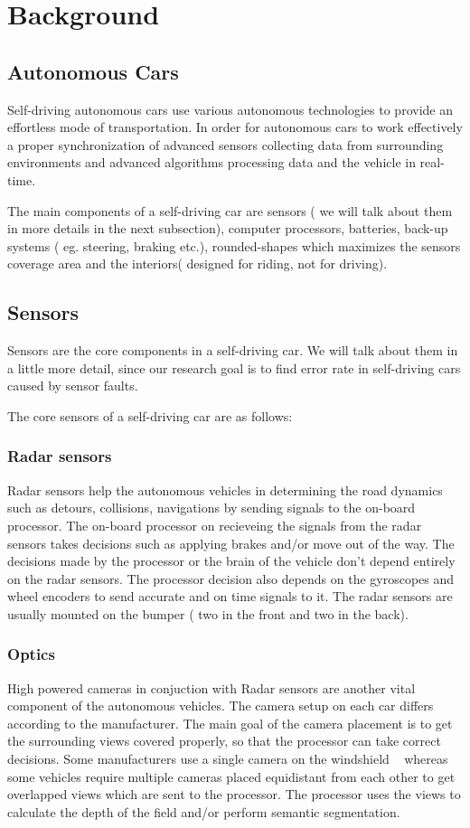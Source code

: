 \section{Background}
\subsection{ Autonomous Cars}
Self-driving autonomous cars use various autonomous technologies to provide an effortless mode of transportation. In order for autonomous cars to work effectively a proper synchronization of advanced sensors collecting data from surrounding environments and advanced algorithms processing data and the vehicle in real-time.

The main components of a self-driving car are sensors ( we will talk about them in more details in the next subsection), computer processors, batteries, back-up systems ( eg. steering, braking etc.), rounded-shapes which maximizes the sensors coverage area and the interiors( designed for riding, not for driving). 

\subsection{Sensors}
Sensors are the core components in a self-driving car. We will talk about them in a little more detail, since our research goal is to find error rate in self-driving cars caused by sensor faults.

The core sensors of a self-driving car are as follows:
\subsubsection{Radar sensors}
Radar sensors help the autonomous vehicles in determining the road dynamics such as detours, collisions, navigations by sending signals to the on-board processor. The on-board processor on recieveing the signals from the radar sensors takes decisions such as applying brakes and/or move out of the way. The decisions made by the processor or the brain of the vehicle don't depend entirely on the radar sensors. The processor decision also depends on the gyroscopes and  wheel encoders to send accurate and on time signals to it. The radar sensors are usually mounted on the bumper ( two in the front and two in the back).

\subsubsection{Optics}
High powered cameras in conjuction with Radar sensors are another vital component of the autonomous vehicles. The camera setup on each car differs according to the manufacturer. The main goal of the camera placement is to get the surrounding views covered properly, so that the processor can take correct decisions. Some manufacturers use a single camera on the windshield ~\cite{singlecamera} whereas some vehicles require multiple cameras placed equidistant from each other to get overlapped views which are sent to the processor. The processor uses the views to calculate the depth of the field and/or perform semantic segmentation.

